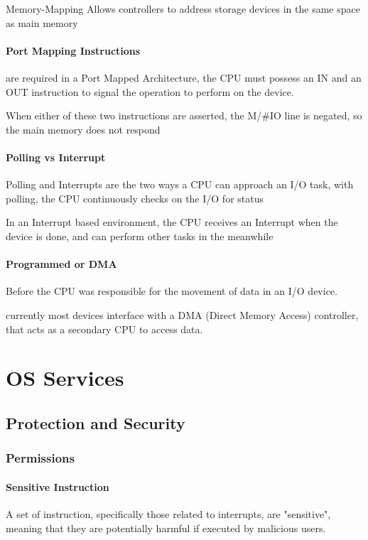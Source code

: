 \documentclass[openright, twoside]{report}
\theoremstyle{definition}
\theoremstyle{example}
\begin{document}
		Memory-Mapping Allows controllers to address storage devices in the same space as main memory
		
		\paragraph{Port Mapping Instructions} are required in a Port Mapped Architecture, 
		the CPU must possess an IN and an OUT instruction to signal the operation to perform on the device. 
		
		When either of these two instructions are asserted, the M/\#IO line is negated, so the main memory does not respond
		
		\paragraph{Polling vs Interrupt} Polling and Interrupts are the two ways a 
		CPU can approach an I/O task, with polling, the CPU continuously checks on the I/O for status
		
		In an Interrupt based environment, the CPU receives an Interrupt when the 
		device is done, and can perform other tasks in the meanwhile
		
		\paragraph{Programmed or DMA} Before the CPU was responsible for the 
		movement of data in an I/O device.
		
		currently most devices interface with a DMA (Direct Memory Access) 
		controller, that acts as a secondary CPU to access data.
		
	\section{OS Services}
		\subsection{Protection and Security}
			\subsubsection{Permissions}
			\paragraph{Sensitive Instruction}
			A set of instruction, specifically 
			those related to interrupts, are "sensitive", meaning that they are 
			potentially harmful if executed by malicious users.
			
\end{document}
